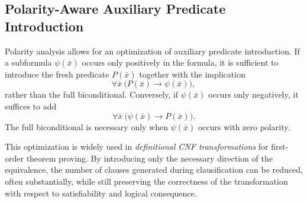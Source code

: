 \subsection{Polarity-Aware Auxiliary Predicate Introduction}\label{subsec:polarity-aware-auxiliary-predicate-introduction}

Polarity analysis allows for an optimization of auxiliary predicate introduction. If a subformula \(\psi(\bar{x})\) occurs only positively in the formula, it is sufficient to introduce the fresh predicate \(P(\bar{x})\) together with the implication
\[
\forall \bar{x}\ \big(P(\bar{x}) \rightarrow \psi(\bar{x})\big),
\]
rather than the full biconditional. Conversely, if \(\psi(\bar{x})\) occurs only negatively, it suffices to add
\[
\forall \bar{x}\ \big(\psi(\bar{x}) \rightarrow P(\bar{x})\big).
\]
The full biconditional is necessary only when \(\psi(\bar{x})\) occurs with zero polarity.

This optimization is widely used in \emph{definitional CNF transformations} for first-order theorem proving. By introducing only the necessary direction of the equivalence, the number of clauses generated during clausification can be reduced, often substantially, while still preserving the correctness of the transformation with respect to satisfiability and logical consequence.







